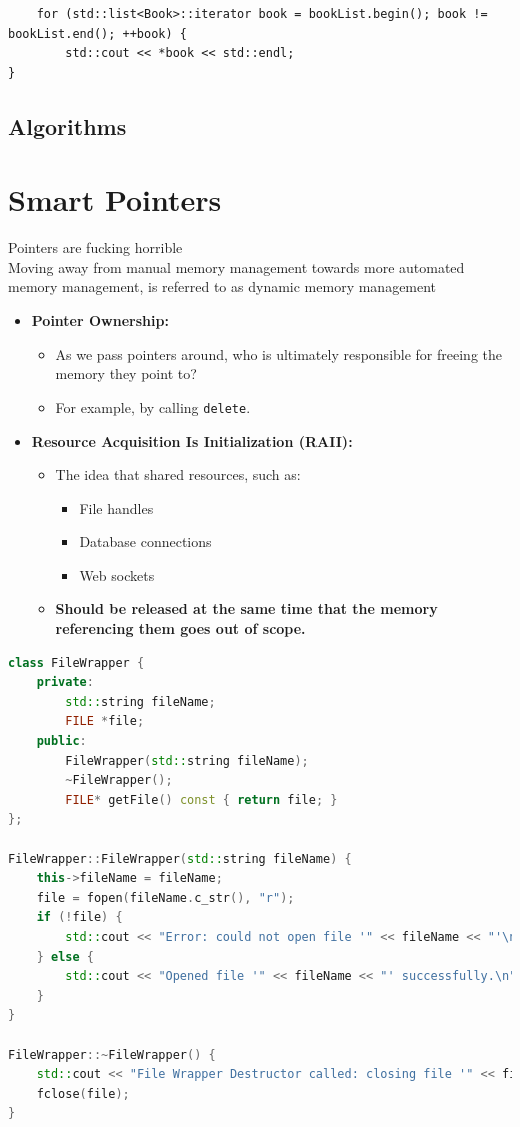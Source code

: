 \documentclass{report}
\begin{document}
\begin{lstlisting}
	for (std::list<Book>::iterator book = bookList.begin(); book != bookList.end(); ++book) {
		std::cout << *book << std::endl;
}
\end{lstlisting}

\subsection{Algorithms}

\section{Smart Pointers}

\noindent Pointers are fucking horrible\\

\noindent Moving away from manual memory
management towards more automated
memory management, is referred to as
dynamic memory management\\

\begin{itemize}
	\item \textbf{Pointer Ownership:}
		  \begin{itemize}
			  \item As we pass pointers around, who is ultimately responsible for freeing the memory they point to?
			  \item For example, by calling \texttt{delete}.
		  \end{itemize}
	\item \textbf{Resource Acquisition Is Initialization (RAII):}
		  \begin{itemize}
			  \item The idea that shared resources, such as:
					\begin{itemize}
						\item File handles
						\item Database connections
						\item Web sockets
					\end{itemize}
			  \item \textbf{Should be released at the same time that the memory referencing them goes out of scope.}
		  \end{itemize}
\end{itemize}

\begin{lstlisting}[language=C++]
class FileWrapper {
	private:
		std::string fileName;
		FILE *file;
	public:
		FileWrapper(std::string fileName);
		~FileWrapper();
		FILE* getFile() const { return file; }
};

FileWrapper::FileWrapper(std::string fileName) {
	this->fileName = fileName;
	file = fopen(fileName.c_str(), "r");
	if (!file) {
		std::cout << "Error: could not open file '" << fileName << "'\n";
	} else {
		std::cout << "Opened file '" << fileName << "' successfully.\n";
	}
}

FileWrapper::~FileWrapper() {
	std::cout << "File Wrapper Destructor called: closing file '" << fileName << "'\n";
	fclose(file);
}
\end{lstlisting}
\end{document}
